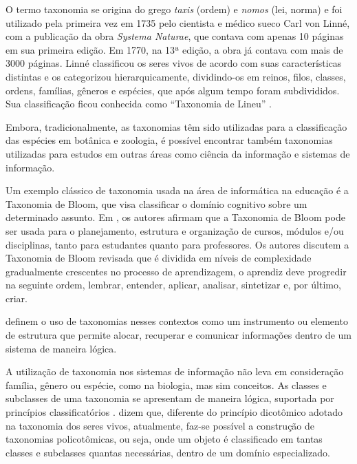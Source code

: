 \par
O termo taxonomia se origina do grego \textit{taxis} (ordem) e \textit{nomos} (lei, norma) e foi utilizado pela primeira vez em 1735 pelo cientista e médico sueco Carl von Linné,
com a publicação da obra \textit{Systema Naturae}, que contava com apenas 10 páginas em sua primeira edição. Em 1770, na 13ª edição, a obra já contava com mais de 3000 páginas.
Linné classificou os seres vivos de acordo com suas características distintas e os categorizou hierarquicamente, dividindo-os em reinos, filos, classes, ordens, famílias, 
gêneros e espécies, que após algum tempo foram subdivididos. Sua classificação ficou conhecida como “Taxonomia de Lineu” \cite{polaszek2010systema}.

\par
Embora, tradicionalmente, as taxonomias têm sido utilizadas para a classificação das espécies em botânica e zoologia, é possível encontrar também taxonomias utilizadas para estudos em outras áreas como ciência da informação e sistemas de informação.
\par
Um exemplo clássico de taxonomia usada na área de informática na educação é a Taxonomia de Bloom, que visa classificar o domínio cognitivo sobre um determinado assunto. 
Em , os autores afirmam que a Taxonomia de Bloom pode ser usada para o planejamento, estrutura e organização de cursos, módulos e/ou disciplinas, tanto para estudantes quanto para professores. Os autores discutem a Taxonomia de Bloom revisada que é dividida em níveis de complexidade gradualmente crescentes no  processo de aprendizagem, o aprendiz deve progredir na seguinte ordem, lembrar, entender, aplicar, analisar, sintetizar e, por último, criar. 
\par

 definem o uso de taxonomias nesses contextos como um instrumento ou elemento de estrutura que permite alocar,
recuperar e comunicar informações dentro de um sistema de maneira lógica.

\par
A utilização de taxonomia nos sistemas de informação não leva em consideração família, gênero ou espécie, como na biologia, mas sim conceitos.
As classes e subclasses de uma taxonomia se apresentam de maneira lógica, suportada por princípios classificatórios \cite{campos2012taxonomia}.
 dizem que, diferente do princípio dicotômico adotado na taxonomia dos seres vivos, atualmente, faz-se possível a construção de taxonomias
policotômicas, ou seja, onde um objeto é classificado em tantas classes e subclasses quantas necessárias, dentro de um domínio especializado.

